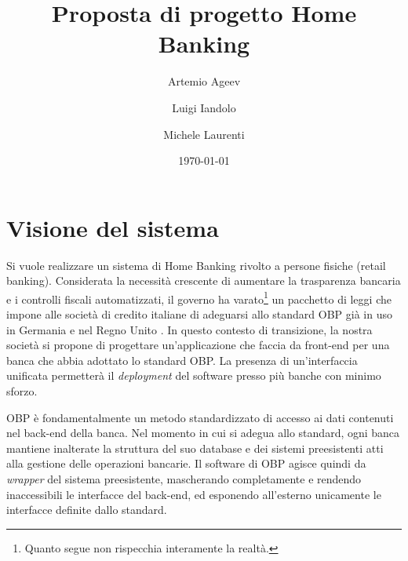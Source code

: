 \documentclass[]{softeng}
\title{Proposta di progetto Home Banking}
\author{Artemio Ageev \and Luigi Iandolo \and Michele Laurenti}
\date{\today}
\begin{document}
\maketitle

\section{Visione del sistema}

Si vuole realizzare un sistema di Home Banking rivolto a persone fisiche (retail banking).
Considerata la necessit\`a crescente di aumentare la trasparenza bancaria e i controlli fiscali automatizzati, il governo ha varato\footnote{Quanto segue non rispecchia interamente la realt\`a.} un pacchetto di leggi che impone alle societ\`a di credito italiane di adeguarsi allo standard OBP \cite{obp} gi\`a in uso in Germania e nel Regno Unito \cite{obpuk}.
In questo contesto di transizione, la nostra societ\`a si propone di progettare un'applicazione che faccia da front-end per una banca che abbia adottato lo standard OBP.
La presenza di un'interfaccia unificata permetter\`a il \emph{deployment} del software presso pi\`u banche con minimo sforzo.

OBP \`e fondamentalmente un metodo standardizzato di accesso ai dati contenuti nel back-end della banca.
Nel momento in cui si adegua allo standard, ogni banca mantiene inalterate la struttura del suo database e dei sistemi preesistenti atti alla gestione delle operazioni bancarie.
Il software di OBP agisce quindi da \emph{wrapper} del sistema preesistente, mascherando completamente e rendendo inaccessibili le interfacce del back-end, ed esponendo all'esterno unicamente le interfacce definite dallo standard.
\end{document}
